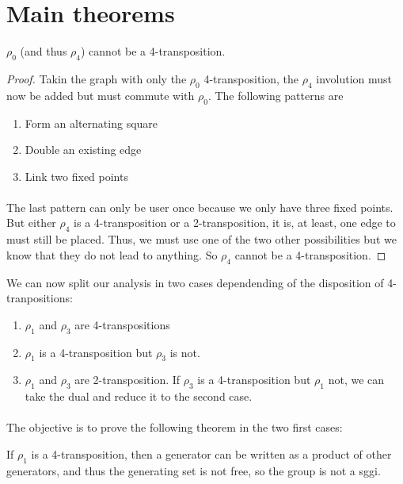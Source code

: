 \section{Main theorems}

\begin{lemma}
  $\rho_0$ (and thus $\rho_4$) cannot be a 4-transposition.
\end{lemma}

\begin{proof}
  Takin the graph with only the $\rho_0$ 4-transposition, the $\rho_4$ involution must now be added but must commute with $\rho_0$. The following patterns are
  \begin{enumerate}
    \item Form an alternating square
    \item Double an existing edge
    \item Link two fixed points
  \end{enumerate}

  \paragraph{}
  The last pattern can only be user once because we only have three fixed points. But either $\rho_4$ is a 4-transposition or a 2-transposition, it is, at least, one edge to must still be placed. Thus, we must use one of the two other possibilities but we know that they do not lead to anything. So $\rho_4$ cannot be a 4-transposition.

\end{proof}

We can now split our analysis in two cases dependending of the disposition of 4-tranpositions:
\begin{enumerate}
  \item $\rho_1$ and $\rho_3$ are 4-transpositions
  \item $\rho_1$ is a 4-transposition but $\rho_3$ is not.
  \item $\rho_1$ and $\rho_3$ are 2-transposition. If $\rho_3$ is a 4-transposition but $\rho_1$ not, we can take the dual and reduce it to the second case.
\end{enumerate}

\paragraph{}
The objective is to prove the following theorem in the two first cases:
\begin{theorem}
  If $\rho_1$ is a 4-transposition, then a generator can be written as a product of other generators, and thus the generating set is not free, so the group is not a sggi.
\end{theorem}

